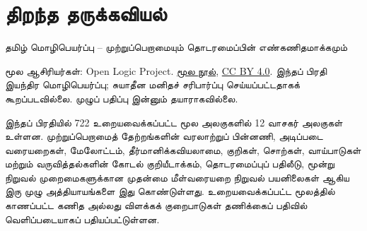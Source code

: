 \documentclass[11pt,a4paper,openany]{memoir}
\begin{document}
\raggedright
\raggedbottom
\pagestyle{plain}
\chapter*{திறந்த தருக்கவியல்}
\noindent தமிழ் மொழிபெயர்ப்பு -- முற்றுப்பெறாமையும் தொடரமைப்பின் எண்கணிதமாக்கமும்

\noindent மூல ஆசிரியர்கள்: Open Logic Project.
\href{https://github.com/OpenLogicProject/OpenLogic}{மூல நூல்},
\href{https://creativecommons.org/licenses/by/4.0/}{CC BY 4.0}.
இந்தப் பிரதி இயந்திர மொழிபெயர்ப்பு; சுயாதீன மனிதச் சரிபார்ப்பு செய்யப்பட்டதாகக்
கூறப்படவில்லை. முழுப் பதிப்பு இன்னும் தயாராகவில்லை.

\noindent இந்தப் பிரதியில் 722 உறையவைக்கப்பட்ட மூல அலகுகளில் 12
வாசகர் அலகுகள் உள்ளன. முற்றுப்பெறாமைத் தேற்றங்களின் வரலாற்றுப் பின்னணி,
அடிப்படை வரையறைகள், மேலோட்டம், தீர்மானிக்கவியலாமை, குறிகள், சொற்கள்,
வாய்பாடுகள் மற்றும் வருவித்தல்களின் கோடல் குறியீடாக்கம், தொடரமைப்புப்
பதிலீடு, மூன்று நிறுவல் முறைமைகளுக்கான முதன்மை மீள்வரையறை நிறுவல்
பயனிலைகள் ஆகிய இரு முழு அத்தியாயங்களை இது கொண்டுள்ளது. உறையவைக்கப்பட்ட
மூலத்தில் காணப்பட்ட கணித அல்லது விளக்கக் குறைபாடுகள் தணிக்கைப் பதிவில்
வெளிப்படையாகப் பதியப்பட்டுள்ளன.

\clearpage
\tableofcontents*


\end{document}
